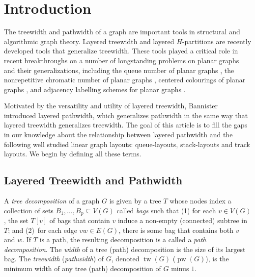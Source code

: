 \documentclass{patmorin}
\DeclareMathOperator{\pw}{pw}
\DeclareMathOperator{\tw}{tw}
\begin{document}

\section{Introduction}

The treewidth and pathwidth of a graph are important tools in
structural and algorithmic graph theory. Layered treewidth and layered
$H$-partitions are recently developed tools that generalize
treewidth. These tools played a critical role in recent breakthroughs on a
number of longstanding problems on planar graphs and their generalizations, including the queue number of planar graphs \cite{dujmovic.joret.ea:planar}, the nonrepetitive chromatic number of planar graphs \cite{dujmovic.esperet.ea:planar}, centered colourings of planar graphs \cite{debski.felsner.ea:improved}, and adjacency labelling schemes for planar graphs \cite{bonamy.gavoille.ea:shorter,dujmovic.esperet.ea:adjacency}.



Motivated
by the versatility and utility of layered treewidth, Bannister
\etal\ \cite{DBLP:conf/gd/BannisterDDEW16,bannister2018track}
introduced  layered pathwidth, which generalizes pathwidth in the same way
that layered treewidth generalizes treewidth.  The goal of this article is to fill the gaps in our knowledge about
the relationship between layered pathwidth and the following well studied
linear graph layouts: queue-layouts, stack-layouts and track
layouts.  We begin by defining all these terms.

\subsection{Layered Treewidth and Pathwidth}

A {\em tree decomposition} of a graph $G$ is given by a tree $T$ whose
nodes index a collection of sets $B_1,\ldots,B_p\subseteq V(G)$ called
\emph{bags} such that (1) for each $v\in V(G)$, the set $T[v]$ of bags that contain $v$ induce a
     non-empty (connected) subtree in $T$; and (2)~for each edge $vw\in E(G)$, there is some bag that contains both $v$ and $w$. If $T$ is a path, the resulting decomposition is a called a \emph{path decomposition}. The \emph{width} of a tree (path)
   decomposition is the size of its largest bag.  The \emph{treewidth}
   (\emph{pathwidth}) of $G$, denoted $\tw(G)$ ($\pw(G)$), is the minimum width of any tree (path) decomposition of $G$ minus $1$.
\end{document}
